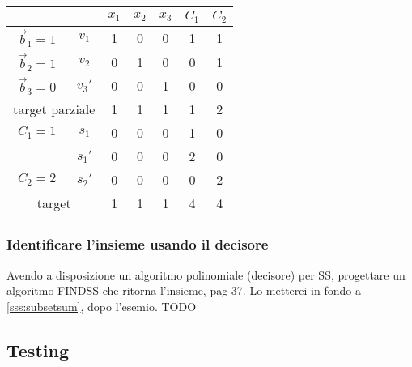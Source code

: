 \begin{center}
    \begin{tabular}[h]{cc|ccc|cc}
                         &        & $x_1$ & $x_2$ & $x_3$ & $C_1$ & $C_2$ \\
        \hline
        $\vec{b}_1 = 1 $ & $v_1$  & 1 & 0 & 0 & 1 & 1 \\
        $\vec{b}_2 = 1 $ & $v_2$  & 0 & 1 & 0 & 0 & 1 \\
        $\vec{b}_3 = 0 $ & $v_3'$ & 0 & 0 & 1 & 0 & 0 \\
        \hline
        \multicolumn{2}{c}{target parziale}  & 1 & 1 & 1 & 1 & 2 \\
        \hline
        $C_1 = 1$ & $s_1$  & 0 & 0 & 0 & 1 & 0 \\
                  & $s_1'$ & 0 & 0 & 0 & 2 & 0 \\
        $C_2 = 2$ & $s_2'$ & 0 & 0 & 0 & 0 & 2 \\
        \hline
        \multicolumn{2}{c}{target} & 1 & 1 & 1 & 4 & 4 \\
    \end{tabular}
\end{center}

\subsubsection{Identificare l'insieme usando il decisore}

Avendo a disposizione un algoritmo polinomiale (decisore) per SS, progettare un algoritmo FINDSS che ritorna l'insieme, pag 37.
Lo metterei in fondo a \ref{sss:subsetsum}, dopo l'esemio.
TODO


\subsection{Testing}

